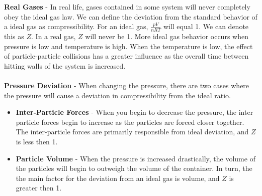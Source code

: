 \documentclass{article}
\begin{document}
\vspace{10pt}
\noindent\textbf{Real Gases} - In real life, gases contained in some system will never completely obey the ideal gas law. We can define the deviation from the standard behavior of a ideal gas as compressibility. For an ideal gas, $\frac{pV}{nRT}$ will equal 1. We can denote this as $Z$. In a real gas, $Z$ will never be 1. More ideal gas behavior occurs when pressure is low and temperature is high. When the temperature is low, the effect of particle-particle collisions has a greater influence as the overall time between hitting walls of the system is increased.\\
\\
\textbf{Pressure Deviation} - When changing the pressure, there are two cases where the pressure will cause a deviation in compressibility from the ideal ratio.\\
\begin{itemize}
	\item \textbf{Inter-Particle Forces} - When you begin to decrease the pressure, the inter particle forces begin to increase as the particles are forced closer together. The inter-particle forces are primarily responsible from ideal deviation, and $Z$ is less then 1.
	\item \textbf{Particle Volume} - When the pressure is increased drastically, the volume of the particles will begin to outweigh the volume of the container. In turn, the the main factor for the deviation from an ideal gas is volume, and $Z$ is greater then 1.
\end{itemize}
\end{document}
